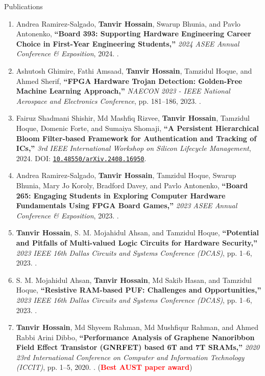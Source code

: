 \begin{rSection}{Publications}
\begin{enumerate}[label=\arabic*.]
    \item Andrea Ramirez-Salgado, \textbf{Tanvir Hossain}, Swarup Bhunia, and Pavlo Antonenko, \textbf{``Board 393: Supporting Hardware Engineering Career Choice in First-Year Engineering Students,''} \emph{2024 ASEE Annual Conference \& Exposition}, 2024. .

    \item Ashutosh Ghimire, Fathi Amsaad, \textbf{Tanvir Hossain}, Tamzidul Hoque, and Ahmed Sherif, \textbf{``FPGA Hardware Trojan Detection: Golden-Free Machine Learning Approach,''} \emph{NAECON 2023 - IEEE National Aerospace and Electronics Conference}, pp. 181--186, 2023. .

    \item Fairuz Shadmani Shishir, Md Mashfiq Rizvee, \textbf{Tanvir Hossain}, Tamzidul Hoque, Domenic Forte, and Sumaiya Shomaji, \textbf{``A Persistent Hierarchical Bloom Filter-based Framework for Authentication and Tracking of ICs,''} \emph{3rd IEEE International Workshop on Silicon Lifecycle Management}, 2024. DOI: \href{https://doi.org/10.48550/arXiv.2408.16950}{\nolinkurl{10.48550/arXiv.2408.16950}}.

    \item Andrea Ramirez-Salgado, \textbf{Tanvir Hossain}, Tamzidul Hoque, Swarup Bhunia, Mary Jo Koroly, Bradford Davey, and Pavlo Antonenko, \textbf{``Board 265: Engaging Students in Exploring Computer Hardware Fundamentals Using FPGA Board Games,''} \emph{2023 ASEE Annual Conference \& Exposition}, 2023. .

    \item \textbf{Tanvir Hossain}, S. M. Mojahidul Ahsan, and Tamzidul Hoque, \textbf{``Potential and Pitfalls of Multi-valued Logic Circuits for Hardware Security,''} \emph{2023 IEEE 16th Dallas Circuits and Systems Conference (DCAS)}, pp. 1--6, 2023. .

    \item S. M. Mojahidul Ahsan, \textbf{Tanvir Hossain}, Md Sakib Hasan, and Tamzidul Hoque, \textbf{``Resistive RAM-based PUF: Challenges and Opportunities,''} \emph{2023 IEEE 16th Dallas Circuits and Systems Conference (DCAS)}, pp. 1--6, 2023. .

    \item \textbf{Tanvir Hossain}, Md Shyeem Rahman, Md Mushfiqur Rahman, and Ahmed Rabbi Arini Dibbo, \textbf{``Performance Analysis of Graphene Nanoribbon Field Effect Transistor (GNRFET) based 6T and 7T SRAMs,''} \emph{2020 23rd International Conference on Computer and Information Technology (ICCIT)}, pp. 1--5, 2020. . (\textbf{\textcolor{red}{Best AUST paper award}})
\end{enumerate}


\end{rSection}
